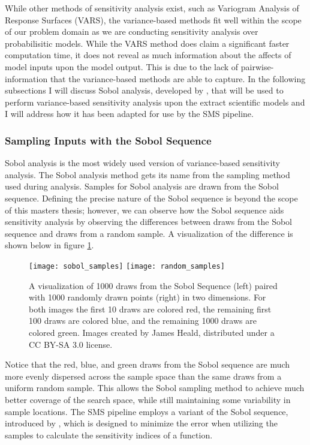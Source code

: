 While other methods of sensitivity analysis exist, such as Variogram Analysis of Response Surfaces (VARS), the variance-based methods fit well within the scope of our problem domain as we are conducting sensitivity analysis over probabilisitic models.
While the VARS method does claim a significant faster computation time, it does not reveal as much information about the affects of model inputs upon the model output.
This is due to the lack of pairwise-information that the variance-based methods are able to capture.
In the following subsections I will discuss Sobol analysis, developed by \citet{sobol2001globalSA}, that will be used to perform variance-based sensitivity analysis upon the extract scientific models and I will address how it has been adapted for use by the SMS pipeline.

\subsubsection{Sampling Inputs with the Sobol Sequence\label{sec:sobol_seq}}
Sobol analysis is the most widely used version of variance-based sensitivity analysis. The Sobol analysis method gets its name from the sampling method used during analysis. Samples for Sobol analysis are drawn from the Sobol sequence. Defining the precise nature of the Sobol sequence is beyond the scope of this masters thesis; however, we can observe how the Sobol sequence aids sensitivity analysis by observing the differences between draws from the Sobol sequence and draws from a random sample. A visualization of the difference is shown below in figure \ref{sobol_seq_vis}.

\FloatBarrier
\begin{figure}[!htbp]
    \label{sobol_seq_vis}
    \centering
    \texttt{[image: sobol\_samples]}\hfill
    \texttt{[image: random\_samples]}
    \caption[Sobol Sequence Visualization]{A visualization of 1000 draws from the Sobol Sequence (left) paired with 1000 randomly drawn points (right) in two dimensions. For both images the first 10 draws are colored red, the remaining first 100 draws are colored blue, and the remaining 1000 draws are colored green. Images created by James Heald, distributed under a CC BY-SA 3.0 license.}
\end{figure}
\FloatBarrier

Notice that the red, blue, and green draws from the Sobol sequence are much more evenly dispersed across the sample space than the same draws from a uniform random sample. This allows the Sobol sampling method to achieve much better coverage of the search space, while still maintaining some variability in sample locations. The SMS pipeline employs a variant of the Sobol sequence, introduced by \citet{saltelli2002ImprovedSobolSeq}, which is designed to minimize the error when utilizing the samples to calculate the sensitivity indices of a function.

